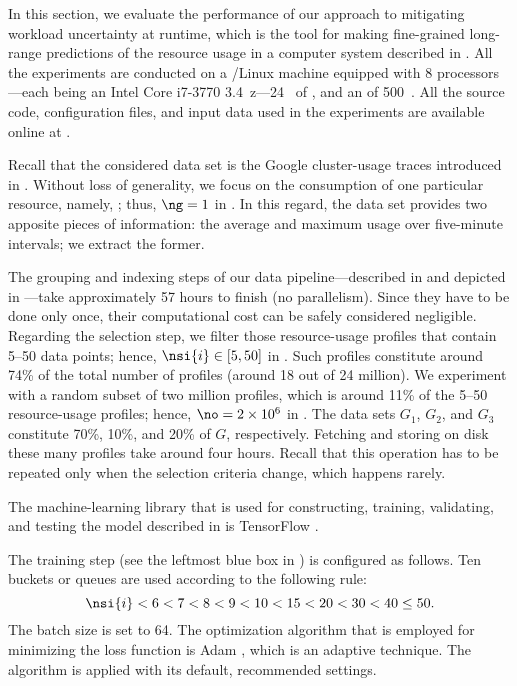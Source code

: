 In this section, we evaluate the performance of our approach to mitigating
workload uncertainty at runtime, which is the tool for making fine-grained
long-range predictions of the resource usage in a computer system described in
. All the experiments are conducted on a /Linux
machine equipped with 8 processors---each being an Intel Core i7-3770
3.4~z---24~ of , and an  of 500~. All the
source code, configuration files, and input data used in the experiments are
available online at \cite{eslab2017b}.


Recall that the considered data set is the Google cluster-usage traces
\cite{reiss2011} introduced in . Without loss of generality, we
focus on the consumption of one particular resource, namely, ; thus,
$\ng = 1$ in . In this regard, the data set provides two
apposite pieces of information: the average and maximum  usage over
five-minute intervals; we extract the former.

The grouping and indexing steps of our data pipeline---described in
 and depicted in ---take approximately 57
hours to finish (no parallelism). Since they have to be done only once, their
computational cost can be safely considered negligible. Regarding the selection
step, we filter those resource-usage profiles that contain 5--50 data points;
hence, $\nsi{i} \in [5, 50]$ in . Such profiles constitute
around 74\% of the total number of profiles (around 18 out of 24 million). We
experiment with a random subset of two million profiles, which is around 11\% of
the 5--50 resource-usage profiles; hence, $\no = 2 \times 10^6$ in
. The data sets $G_1$, $G_2$, and $G_3$ constitute 70\%,
10\%, and 20\% of $G$, respectively. Fetching and storing on disk these many
profiles take around four hours. Recall that this operation has to be repeated
only when the selection criteria change, which happens rarely.


The machine-learning library that is used for constructing, training,
validating, and testing the model described in  is TensorFlow
\cite{abadi2015}.

The training step (see the leftmost blue box in ) is
configured as follows. Ten buckets or queues are used according to the following
rule:
\[
  \nsi{i} < 6 < 7 < 8 < 9 < 10 < 15 < 20 < 30 < 40 \leq 50.
\]
The batch size \nb is set to 64. The optimization algorithm that is employed for
minimizing the loss function is Adam \cite{kingma2014}, which is an adaptive
technique. The algorithm is applied with its default, recommended settings.

